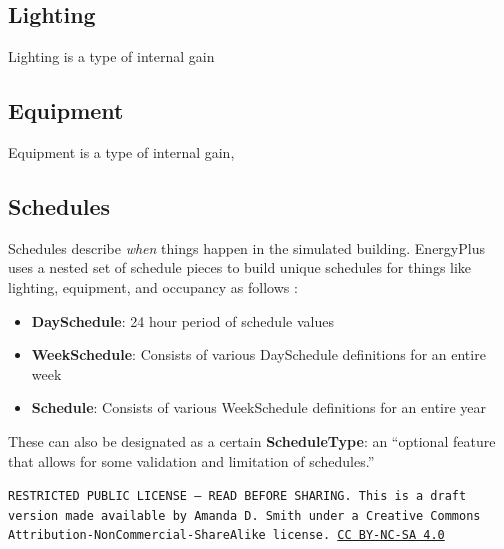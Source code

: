 \documentclass[10pt]{article}
\begin{document}
\subsection{Lighting}

Lighting is a type of internal gain

\subsection{Equipment}

Equipment is a type of internal gain, 

\subsection{Schedules}

Schedules describe \textit{when} things happen in the simulated building. EnergyPlus uses a nested set of schedule pieces to build unique schedules for things like lighting, equipment, and occupancy as follows \cite{EPcourseteaching}:

\vspace{-6pt}
\begin{itemize}
    \setlength{\itemsep}{0pt}%
    \setlength{\parskip}{0pt}%
    \item \textbf{DaySchedule}: 24 hour period of schedule values
    \item \textbf{WeekSchedule}: Consists of various DaySchedule definitions for an entire week
    \item \textbf{Schedule}: Consists of various WeekSchedule definitions for an entire year
\end{itemize}
\vspace{-6pt}

These can also be designated as a certain \textbf{ScheduleType}: an ``optional feature that allows for some validation and limitation of schedules.'' \cite{EPcourseteaching}


\bigskip

\noindent
\texttt{\footnotesize RESTRICTED PUBLIC LICENSE --- READ BEFORE SHARING. This is a draft version made available by Amanda D. Smith under a Creative Commons Attribution-NonCommercial-ShareAlike license. 
\href{https://creativecommons.org/licenses/by-nc-sa/4.0/}{CC BY-NC-SA 4.0}}

\newpage
\printbibliography
\end{document}
